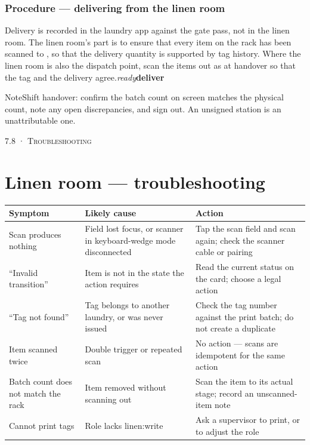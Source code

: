 \documentclass[11pt,a4paper,oneside]{book}
\begin{document}
\subsubsection*{Procedure — delivering from the linen room}
Delivery is recorded in the laundry app against the gate pass, not in the linen room. The linen room's part is to ensure that every item on the rack has been scanned to , so that the delivery quantity is supported by tag history. Where the linen room is also the dispatch point, scan the items out as  at handover so that the tag and the delivery agree.\emph{ready}\textbf{deliver}

\begin{notebox}NoteShift handover: confirm the batch count on screen matches the physical count, note any open discrepancies, and sign out. An unsigned station is an unattributable one.\end{notebox}
\textsc{\small\color{crimson}7.8 · Troubleshooting}\par\medskip
\section*{Linen room — troubleshooting}
\begin{center}\small
\begin{tabularx}{\linewidth}{|X|X|X|}
\hline
\rowcolor{lightgrey}
\textbf{Symptom} & \textbf{Likely cause} & \textbf{Action} \\ \hline
Scan produces nothing & Field lost focus, or scanner in keyboard-wedge mode disconnected & Tap the scan field and scan again; check the scanner cable or pairing \\ \hline
“Invalid transition” & Item is not in the state the action requires & Read the current status on the card; choose a legal action \\ \hline
“Tag not found” & Tag belongs to another laundry, or was never issued & Check the tag number against the print batch; do not create a duplicate \\ \hline
Item scanned twice & Double trigger or repeated scan & No action — scans are idempotent for the same action \\ \hline
Batch count does not match the rack & Item removed without scanning out & Scan the item to its actual stage; record an unscanned-item note \\ \hline
Cannot print tags & Role lacks linen:write & Ask a supervisor to print, or to adjust the role \\ \hline
\end{tabularx}
\end{center}
\end{document}
